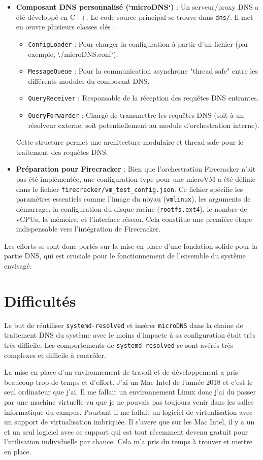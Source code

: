 \documentclass[12pt]{article}
\begin{document}
\begin{itemize}
    \item \textbf{Composant DNS personnalisé (`microDNS`)} : Un serveur/proxy DNS a été développé en C++. Le code source principal se trouve dans \texttt{dns/}. Il met en œuvre plusieurs classes clés :
        \begin{itemize}
            \item \texttt{ConfigLoader} : Pour charger la configuration à partir d'un fichier (par exemple, `./microDNS.conf`).
            \item \texttt{MessageQueue} : Pour la communication asynchrone "thread safe" entre les différents modules du composant DNS.
            \item \texttt{QueryReceiver} : Responsable de la réception des requêtes DNS entrantes.
            \item \texttt{QueryForwarder} : Chargé de transmettre les requêtes DNS (soit à un résolveur externe, soit potentiellement au module d'orchestration interne).
        \end{itemize}
    Cette structure permet une architecture modulaire et thread-safe pour le traitement des requêtes DNS.
    \item \textbf{Préparation pour Firecracker} : Bien que l'orchestration Firecracker n'ait pas été implémentée, une configuration type pour une microVM a été définie dans le fichier \texttt{firecracker/vm\_test\_config.json}. Ce fichier spécifie les paramètres essentiels comme l'image du noyau (\texttt{vmlinux}), les arguments de démarrage, la configuration du disque racine (\texttt{rootfs.ext4}), le nombre de vCPUs, la mémoire, et l'interface réseau. Cela constitue une première étape indispensable vers l'intégration de Firecracker.
\end{itemize}
Les efforts se sont donc portés sur la mise en place d'une fondation solide pour la partie DNS, qui est cruciale pour le fonctionnement de l'ensemble du système envisagé.

\section{Difficultés}
Le but de réutiliser \texttt{systemd-resolved} et insérer \texttt{microDNS} dans la chaine de traitement DNS du système avec le moins d'impacte à sa configuration était très très difficile. Les comportements de \texttt{systemd-resolved} se sont avérés très complexes et difficile à contrôler.

La mise en place d'un environnement de travail et de développement a pris beaucoup trop de temps et d'effort. J'ai un Mac Intel de l'année 2018 et c'est le seul ordinateur que j'ai. Il me fallait un environnement Linux donc j'ai du passer par une machine virtuelle vu que je ne pouvais pas toujours venir dans les salles informatique du campus. Pourtant il me fallait un logiciel de virtualisation avec un support de virtualisation imbriquée. Il s'avere que sur les Mac Intel, il y a un et un seul logiciel avec ce support qui est tout récemment devenu gratuit pour l'utilisation individuelle par chance. Cela m'a pris du temps à trouver et mettre en place.
\end{document}

